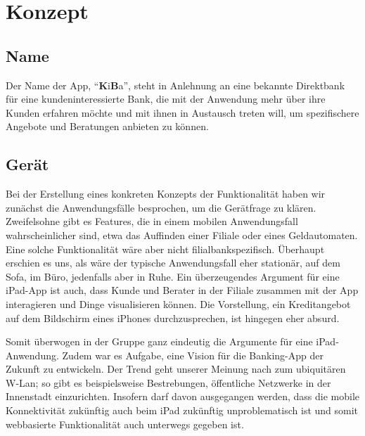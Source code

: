 \section{Konzept}
\subsection{Name}
    Der Name der App, "`\textbf{K}i\textbf{B}a"', steht in Anlehnung an eine bekannte Direktbank für eine kundeninteressierte Bank, die mit der Anwendung mehr über ihre Kunden erfahren möchte und mit ihnen in Austausch treten will, um spezifischere Angebote und Beratungen anbieten zu können.
    
\subsection{Gerät}
    Bei der Erstellung eines konkreten Konzepts der Funktionalität haben wir zunächst die Anwendungsfälle besprochen, um die Gerätfrage zu klären. Zweifelsohne gibt es Features, die in einem mobilen Anwendungsfall wahrscheinlicher sind, etwa das Auffinden einer Filiale oder eines Geldautomaten. Eine solche Funktionalität wäre aber nicht filialbankspezifisch. Überhaupt erschien es uns, als wäre der typische Anwendungsfall eher stationär, auf dem Sofa, im Büro, jedenfalls aber in Ruhe. Ein überzeugendes Argument für eine iPad-App ist auch, dass Kunde und Berater in der Filiale zusammen mit der App interagieren und Dinge visualisieren können. Die Vorstellung, ein Kreditangebot auf dem Bildschirm eines iPhones durchzusprechen, ist hingegen eher absurd. 
    
    
    Somit überwogen in der Gruppe ganz eindeutig die Argumente für eine iPad-Anwendung. Zudem war es Aufgabe, eine Vision für die Banking-App der Zukunft zu entwickeln. Der Trend geht unserer Meinung nach zum ubiquitären W-Lan; so gibt es beispielsweise Bestrebungen, öffentliche Netzwerke in der Innenstadt einzurichten. Insofern darf davon ausgegangen werden, dass die mobile Konnektivität zukünftig auch beim iPad zukünftig unproblematisch ist und somit webbasierte Funktionalität auch unterwegs gegeben ist.
    

